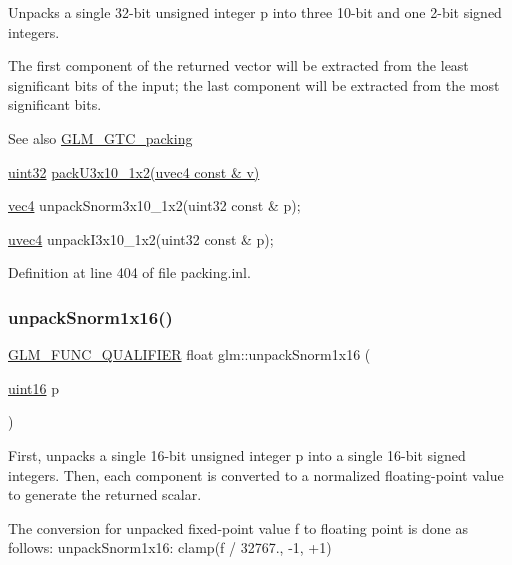 Unpacks a single 32-\/bit unsigned integer p into three 10-\/bit and one 2-\/bit signed integers.

The first component of the returned vector will be extracted from the least significant bits of the input; the last component will be extracted from the most significant bits.

\begin{DoxySeeAlso}{See also}
\hyperlink{group__gtc__packing}{G\+L\+M\+\_\+\+G\+T\+C\+\_\+packing} 

\hyperlink{group__gtc__type__precision_ga202b6a53c105fcb7e531f9b443518451}{uint32} \hyperlink{group__gtc__packing_gaf656d8862628f96b20de7a36eaa1fe56}{pack\+U3x10\+\_\+1x2(uvec4 const \& v)} 

\hyperlink{group__core__types_ga5881b1b022d7fd1b7218f5916532dd02}{vec4} unpack\+Snorm3x10\+\_\+1x2(uint32 const \& p); 

\hyperlink{group__core__types_ga1c426d19627b32b14f0089f7f4ba7b1d}{uvec4} unpack\+I3x10\+\_\+1x2(uint32 const \& p); 
\end{DoxySeeAlso}


Definition at line 404 of file packing.\+inl.

\mbox{\label{group__gtc__packing_ga246f451cebf590726324f7a283e3d65e}} 
\subsubsection{\texorpdfstring{unpack\+Snorm1x16()}{unpackSnorm1x16()}}
{\footnotesize\ttfamily \hyperlink{setup_8hpp_a33fdea6f91c5f834105f7415e2a64407}{G\+L\+M\+\_\+\+F\+U\+N\+C\+\_\+\+Q\+U\+A\+L\+I\+F\+I\+ER} float glm\+::unpack\+Snorm1x16 (\begin{DoxyParamCaption}\item[{\hyperlink{group__gtc__type__precision_gad8c2939e1fdd8e5828b31d95c52255d5}{uint16}}]{p }\end{DoxyParamCaption})}

First, unpacks a single 16-\/bit unsigned integer p into a single 16-\/bit signed integers. Then, each component is converted to a normalized floating-\/point value to generate the returned scalar.

The conversion for unpacked fixed-\/point value f to floating point is done as follows\+: unpack\+Snorm1x16\+: clamp(f / 32767., -\/1, +1)

